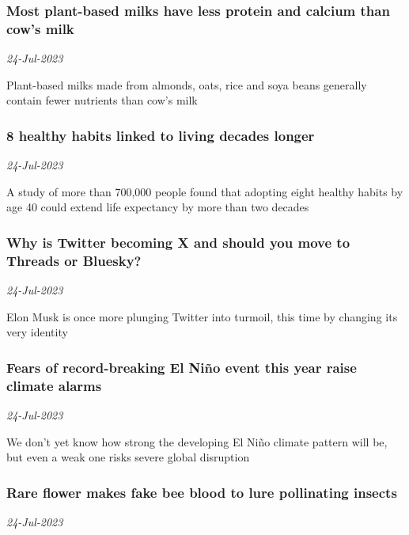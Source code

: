 \subsubsection{Most plant-based milks have less protein and calcium than cow's milk \href{https://www.newscientist.com/article/2383908-most-plant-based-milks-have-less-protein-and-calcium-than-cows-milk/?utm_campaign=RSS%7CNSNS&utm_source=NSNS&utm_medium=RSS&utm_content=home}{}}
\textit{24-Jul-2023}

Plant-based milks made from almonds, oats, rice and soya beans generally contain fewer nutrients than cow's milk
\subsubsection{8 healthy habits linked to living decades longer \href{https://www.newscientist.com/article/2383669-8-healthy-habits-linked-to-living-decades-longer/?utm_campaign=RSS%7CNSNS&utm_source=NSNS&utm_medium=RSS&utm_content=home}{\ding{225}}}
\textit{24-Jul-2023}

A study of more than 700,000 people found that adopting eight healthy habits by age 40 could extend life expectancy by more than two decades
\subsubsection{Why is Twitter becoming X and should you move to Threads or Bluesky? \href{https://www.newscientist.com/article/2383886-why-is-twitter-becoming-x-and-should-you-move-to-threads-or-bluesky/?utm_campaign=RSS%7CNSNS&utm_source=NSNS&utm_medium=RSS&utm_content=home}{}}
\textit{24-Jul-2023}

Elon Musk is once more plunging Twitter into turmoil, this time by changing its very identity
\subsubsection{Fears of record-breaking El Niño event this year raise climate alarms \href{https://www.newscientist.com/article/2383666-fears-of-record-breaking-el-nino-event-this-year-raise-climate-alarms/?utm_campaign=RSS%7CNSNS&utm_source=NSNS&utm_medium=RSS&utm_content=home}{\ding{225}}}
\textit{24-Jul-2023}

We don't yet know how strong the developing El Niño climate pattern will be, but even a weak one risks severe global disruption
\subsubsection{Rare flower makes fake bee blood to lure pollinating insects \href{https://www.newscientist.com/article/2383731-rare-flower-makes-fake-bee-blood-to-lure-pollinating-insects/?utm_campaign=RSS%7CNSNS&utm_source=NSNS&utm_medium=RSS&utm_content=home}{}}
\textit{24-Jul-2023}

